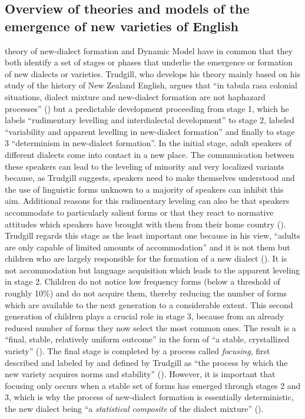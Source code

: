 \subsection{Overview of theories and models of the emergence of new varieties of English}
\label{bkm:Ref524246106}\hypertarget{Toc63021206}{}\label{bkm:Ref525715631}
 theory of new-dialect formation and  Dynamic Model have in common that they both identify a set of stages or phases that underlie the emergence or formation of new dialects or varieties. Trudgill, who develops his theory mainly based on his study of the history of New Zealand English, argues that “in tabula rasa colonial situations, dialect mixture and new-dialect formation are not haphazard processes” (\citeyear[26]{Trudgill2004}) but a predictable development proceeding from stage 1, which he labels “rudimentary levelling and interdialectal development” to stage 2, labeled “variability and apparent levelling in new-dialect formation” and finally to stage 3 “determinism in new-dialect formation”. In the initial stage, adult speakers of different dialects come into contact in a new place. The communication between these speakers can lead to the leveling of minority and very localized variants because, as Trudgill suggests, speakers need to make themselves understood and the use of linguistic forms unknown to a majority of speakers can inhibit this aim. Additional reasons for this rudimentary leveling can also be that speakers accommodate to particularly salient forms or that they react to normative attitudes which speakers have brought with them from their home country (\citeyear[89-93]{Trudgill2004}). Trudgill regards this stage as the least important one because in his view, “adults are only capable of limited amounts of accommodation” and it is not them but children who are largely responsible for the formation of a new dialect (\citeyear[94]{Trudgill2004}). It is not accommodation but language acquisition which leads to the apparent leveling in stage 2. Children do not notice low frequency forms (below a threshold of roughly 10\%) and do not acquire them, thereby reducing the number of forms which are available to the next generation to a considerable extent. This second generation of children plays a crucial role in stage 3, because from an already reduced number of forms they now select the most common ones. The result is a “final, stable, relatively uniform outcome” in the form of “a stable, crystallized variety” (\citeyear[113]{Trudgill2004}). The final stage is completed by a process called \textit{focusing}, first described and labeled by \citet{LePage1985} and defined by Trudgill as “the process by which the new variety acquires norms and stability” (\citeyear[88]{Trudgill2004}). However, it is important that focusing only occurs when a stable set of forms has emerged through stages 2 and 3, which is why the process of new-dialect formation is essentially deterministic, the new dialect being “a \emph{statistical composite} of the dialect mixture” (\citeyear[123]{Trudgill2004}).


